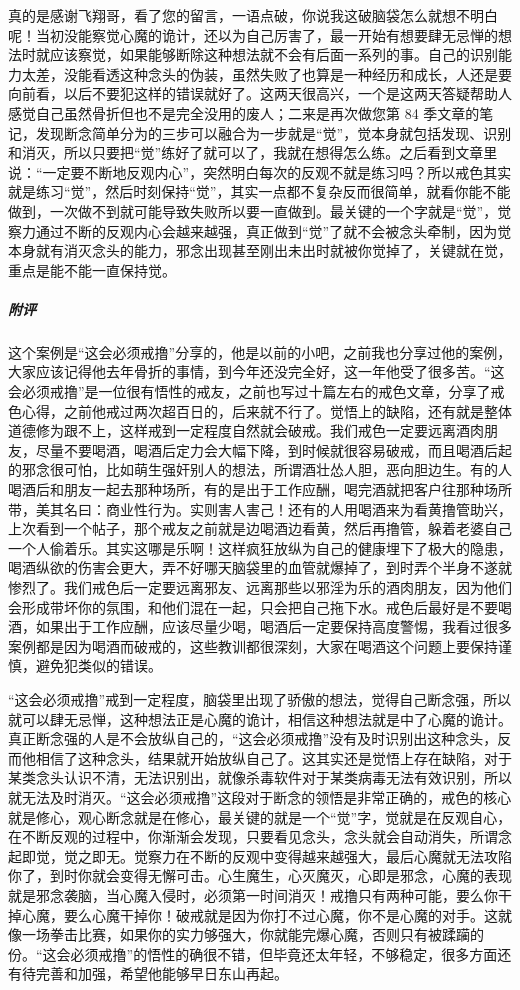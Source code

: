 \begin{case}
    真的是感谢飞翔哥，看了您的留言，一语点破，你说我这破脑袋怎么就想不明白呢！当初没能察觉心魔的诡计，还以为自己厉害了，最一开始有想要肆无忌惮的想法时就应该察觉，如果能够断除这种想法就不会有后面一系列的事。自己的识别能力太差，没能看透这种念头的伪装，虽然失败了也算是一种经历和成长，人还是要向前看，以后不要犯这样的错误就好了。这两天很高兴，一个是这两天答疑帮助人感觉自己虽然骨折但也不是完全没用的废人；二来是再次做您第 84 季文章的笔记，发现断念简单分为的三步可以融合为一步就是“觉”，觉本身就包括发现、识别和消灭，所以只要把“觉”练好了就可以了，我就在想得怎么练。之后看到文章里说：“一定要不断地反观内心”，突然明白每次的反观不就是练习吗？所以戒色其实就是练习“觉”，然后时刻保持“觉”，其实一点都不复杂反而很简单，就看你能不能做到，一次做不到就可能导致失败所以要一直做到。最关键的一个字就是“觉”，觉察力通过不断的反观内心会越来越强，真正做到“觉”了就不会被念头牵制，因为觉本身就有消灭念头的能力，邪念出现甚至刚出未出时就被你觉掉了，关键就在觉，重点是能不能一直保持觉。
    \subparagraph{附评} 这个案例是“这会必须戒撸”分享的，他是以前的小吧，之前我也分享过他的案例，大家应该记得他去年骨折的事情，到今年还没完全好，这一年他受了很多苦。“这会必须戒撸”是一位很有悟性的戒友，之前也写过十篇左右的戒色文章，分享了戒色心得，之前他戒过两次超百日的，后来就不行了。觉悟上的缺陷，还有就是整体道德修为跟不上，这样戒到一定程度自然就会破戒。我们戒色一定要远离酒肉朋友，尽量不要喝酒，喝酒后定力会大幅下降，到时候就很容易破戒，而且喝酒后起的邪念很可怕，比如萌生强奸别人的想法，所谓酒壮怂人胆，恶向胆边生。有的人喝酒后和朋友一起去那种场所，有的是出于工作应酬，喝完酒就把客户往那种场所带，美其名曰：商业性行为。实则害人害己！还有的人用喝酒来为看黄撸管助兴，上次看到一个帖子，那个戒友之前就是边喝酒边看黄，然后再撸管，躲着老婆自己一个人偷着乐。其实这哪是乐啊！这样疯狂放纵为自己的健康埋下了极大的隐患，喝酒纵欲的伤害会更大，弄不好哪天脑袋里的血管就爆掉了，到时弄个半身不遂就惨烈了。我们戒色后一定要远离邪友、远离那些以邪淫为乐的酒肉朋友，因为他们会形成带坏你的氛围，和他们混在一起，只会把自己拖下水。戒色后最好是不要喝酒，如果出于工作应酬，应该尽量少喝，喝酒后一定要保持高度警惕，我看过很多案例都是因为喝酒而破戒的，这些教训都很深刻，大家在喝酒这个问题上要保持谨慎，避免犯类似的错误。

    “这会必须戒撸”戒到一定程度，脑袋里出现了骄傲的想法，觉得自己断念强，所以就可以肆无忌惮，这种想法正是心魔的诡计，相信这种想法就是中了心魔的诡计。真正断念强的人是不会放纵自己的，“这会必须戒撸”没有及时识别出这种念头，反而他相信了这种念头，结果就开始放纵自己了。这其实还是觉悟上存在缺陷，对于某类念头认识不清，无法识别出，就像杀毒软件对于某类病毒无法有效识别，所以就无法及时消灭。“这会必须戒撸”这段对于断念的领悟是非常正确的，戒色的核心就是修心，观心断念就是在修心，最关键的就是一个“觉”字，觉就是在反观自心，在不断反观的过程中，你渐渐会发现，只要看见念头，念头就会自动消失，所谓念起即觉，觉之即无。觉察力在不断的反观中变得越来越强大，最后心魔就无法攻陷你了，到时你就会变得无懈可击。心生魔生，心灭魔灭，心即是邪念，心魔的表现就是邪念袭脑，当心魔入侵时，必须第一时间消灭！戒撸只有两种可能，要么你干掉心魔，要么心魔干掉你！破戒就是因为你打不过心魔，你不是心魔的对手。这就像一场拳击比赛，如果你的实力够强大，你就能完爆心魔，否则只有被蹂躏的份。“这会必须戒撸”的悟性的确很不错，但毕竟还太年轻，不够稳定，很多方面还有待完善和加强，希望他能够早日东山再起。
\end{case}

